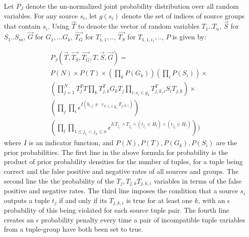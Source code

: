 \documentclass{sig-alternate}
\newcounter{prob}
\begin{document}
Let $P_J$ denote the un-normalized joint probability distribution over all random variables. For any source $s_i$, let $g(s_i)$ denote the set of indices of source groups that contain $s_i$. 
Using $\overrightarrow{T}$ to denote the vector of random variables $T_1..T_n$, $\overrightarrow{S}$ for $S_1..S_m$, $\overrightarrow{G}$ for $G_1, ... G_k$,  $\overrightarrow{T_G}$ for $T_{1, 1}, ..$, $\overrightarrow{T_S}$ for $T_{1, 1, i_1}, ..$, $P$ is given by:

\begin{align}\label{eq:joint-prob} 
& P_J(\overrightarrow{T}, \overrightarrow{T_S}, \overrightarrow{T_G}, T, \overrightarrow{S}, \overrightarrow{G}) =
\\& P(N) \times P(T) \times (\prod_{k} P(G_k)) (\prod_{i} P(S_i)) \times
\\& (\prod_{j=1}^{N} T_{j}^{T}T \prod_{k} T_{j, k}^{T}G_kT_j \prod_{i:s_i\in g_k} T_{j,k,i}^{T}S_iT_{j,k}) \times 
\\& (\prod_{j} \prod_{i} \epsilon^{I(b_{i,j} \neq \lor_{k : s_i \in g_k} T_{j,k,i})})
\\& (\prod_{l} \prod_{1 \leq j_1 < j_2 \leq n} \epsilon^{I(T_{j_1} \land T_{j_2} \land (t_{j_1}\in H_l) \land (t_{j_2} \in H_l)}))
\end{align}
where $I$ is an indicator function, and $P(N), P(T), P(G_k), P(S_i)$ are the prior probabilities. The first line in the above formula for probability is the product of prior probability densities for the number of tuples, for a tuple being correct and the false positive and negative rates of all sources and groups. The second line the the probability of the $T_j, T_{j,k} T_{j,k,i}$ variables in terms of the false positive and negative rates. The third line imposes the condition that a source $s_i$ outputs a tuple $t_j$ if and only if its $T_{j,k,i}$ is true for at least one $k$, with an $\epsilon$ probability of this being violated for each source tuple pair. The fourth line creates an $\epsilon$ probability penalty every time a pair of incompatible tuple variables from a tuple-group have both been set to true.
\end{document}
